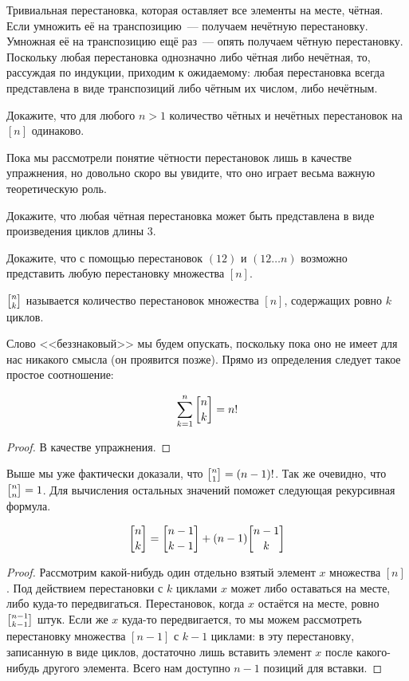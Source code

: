 Тривиальная перестановка, которая оставляет все элементы на месте, чётная. Если умножить её на транспозицию~--- получаем нечётную перестановку. Умножная её на транспозицию ещё раз~--- опять получаем чётную перестановку. Поскольку любая перестановка однозначно либо чётная либо нечётная, то, рассуждая по индукции, приходим к ожидаемому: любая перестановка всегда представлена в виде транспозиций либо чётным их числом, либо нечётным.

\begin{exercise}\label{ex:sgnpermgrp}
Докажите, что для любого $n>1$ количество чётных и нечётных перестановок на $[n]$ одинаково.
\end{exercise}

Пока мы рассмотрели понятие чётности перестановок лишь в качестве упражнения, но довольно скоро вы увидите, что оно играет весьма важную теоретическую роль.

\begin{exercise}
Докажите, что любая чётная перестановка может быть представлена в виде произведения циклов длины 3.
\end{exercise}

\begin{exercise}
Докажите, что с помощью перестановок $(12)$ и $(12\ldots n)$ возможно представить любую перестановку множества $[n]$.
\end{exercise}

\begin{definition}
 $\fstirling{n}{k}$ называется количество перестановок множества $[n]$, содержащих ровно $k$ циклов.
\end{definition}

Слово <<беззнаковый>> мы будем опускать, поскольку пока оно не имеет для нас никакого смысла (он проявится позже). Прямо из определения следует такое простое соотношение:

\begin{thm}
$$\sum_{k=1}^n \fstirling{n}{k} = n!$$
\end{thm}
\begin{proof}
В качестве упражнения.
\end{proof}

Выше мы уже фактически доказали, что $\fstirling{n}{1} = (n-1)!$. Так же очевидно, что $\fstirling{n}{n} = 1$. Для вычисления остальных значений поможет следующая рекурсивная формула.

\begin{thm}
$$\fstirling{n}{k} = \fstirling{n-1}{k-1} + (n-1)\fstirling{n-1}{k}$$
\end{thm}
\begin{proof}
Рассмотрим какой-нибудь один отдельно взятый элемент $x$ множества $[n]$. Под действием перестановки с $k$ циклами $x$ может либо оставаться на месте, либо куда-то передвигаться. Перестановок, когда $x$ остаётся на месте, ровно $\fstirling{n-1}{k-1}$ штук. Если же $x$ куда-то передвигается, то мы можем рассмотреть перестановку множества $[n-1]$ с $k-1$ циклами: в эту перестановку, записанную в виде циклов, достаточно лишь вставить элемент $x$ после какого-нибудь другого элемента. Всего нам доступно $n-1$ позиций для вставки.
\end{proof}

